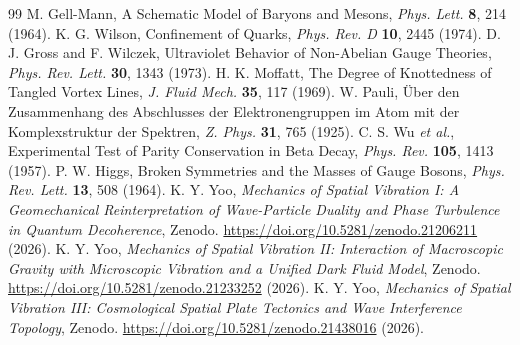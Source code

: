 \documentclass[reprint,amsmath,amssymb,aps,prd]{revtex4-2}
\begin{document}
\begin{thebibliography}{99}
 M. Gell-Mann, A Schematic Model of Baryons and Mesons, \textit{Phys. Lett.} \textbf{8}, 214 (1964).
 K. G. Wilson, Confinement of Quarks, \textit{Phys. Rev. D} \textbf{10}, 2445 (1974).
 D. J. Gross and F. Wilczek, Ultraviolet Behavior of Non-Abelian Gauge Theories, \textit{Phys. Rev. Lett.} \textbf{30}, 1343 (1973).
 H. K. Moffatt, The Degree of Knottedness of Tangled Vortex Lines, \textit{J. Fluid Mech.} \textbf{35}, 117 (1969).
 W. Pauli, \"{U}ber den Zusammenhang des Abschlusses der Elektronengruppen im Atom mit der Komplexstruktur der Spektren, \textit{Z. Phys.} \textbf{31}, 765 (1925).
 C. S. Wu \textit{et al.}, Experimental Test of Parity Conservation in Beta Decay, \textit{Phys. Rev.} \textbf{105}, 1413 (1957).
 P. W. Higgs, Broken Symmetries and the Masses of Gauge Bosons, \textit{Phys. Rev. Lett.} \textbf{13}, 508 (1964).
 K. Y. Yoo, \textit{Mechanics of Spatial Vibration I: A Geomechanical Reinterpretation of Wave-Particle Duality and Phase Turbulence in Quantum Decoherence}, Zenodo. \url{https://doi.org/10.5281/zenodo.21206211} (2026).
 K. Y. Yoo, \textit{Mechanics of Spatial Vibration II: Interaction of Macroscopic Gravity with Microscopic Vibration and a Unified Dark Fluid Model}, Zenodo. \url{https://doi.org/10.5281/zenodo.21233252} (2026).
 K. Y. Yoo, \textit{Mechanics of Spatial Vibration III: Cosmological Spatial Plate Tectonics and Wave Interference Topology}, Zenodo. \url{https://doi.org/10.5281/zenodo.21438016} (2026).
\end{thebibliography}
\end{document}
